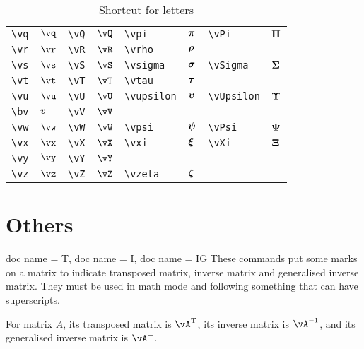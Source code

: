 \documentclass{article}
\begin{document}
\begin{table}[h]
\begin{tabular}{ll|ll|ll|ll}
    \verb"\vq" & $\vq$ & \verb"\vQ" & $\vQ$ & \verb"\vpi" & $\bm{\pi}$ & \verb"\vPi" & $\bm{\Pi}$ \\
    \verb"\vr" & $\vr$ & \verb"\vR" & $\vR$ & \verb"\vrho" & $\bm{\rho}$ & \\
    \verb"\vs" & $\vs$ & \verb"\vS" & $\vS$ & \verb"\vsigma" & $\bm{\sigma}$ & \verb"\vSigma" & $\bm{\Sigma}$ \\
    \verb"\vt" & $\vt$ & \verb"\vT" & $\vT$ & \verb"\vtau" & $\bm{\tau}$ & \\
    \verb"\vu" & $\vu$ & \verb"\vU" & $\vU$ & \verb"\vupsilon" & $\bm{\upsilon}$ & \verb"\vUpsilon" & $\bm{\Upsilon}$ \\
    \verb"\bv" & $\bm{v}$ & \verb"\vV" & $\vV$ & & \\
    \verb"\vw" & $\vw$ & \verb"\vW" & $\vW$ & \verb"\vpsi" & $\bm{\psi}$ & \verb"\vPsi" & $\bm{\Psi}$ \\
    \verb"\vx" & $\vx$ & \verb"\vX" & $\vX$ & \verb"\vxi" & $\bm{\xi}$ & \verb"\vXi" & $\bm{\Xi}$ \\
    \verb"\vy" & $\vy$ & \verb"\vY" & $\vY$ & & \\
    \verb"\vz" & $\vz$ & \verb"\vZ" & $\vZ$ & \verb"\vzeta" & $\bm{\zeta}$ & \\
    \bottomrule
    \end{tabular}
    \caption{Shortcut for letters}
    \label{tab:schortcut-letters}
\end{table}

\section{Others}

\begin{docCommands}{
    {doc name = T},
    {doc name = I},
    {doc name = IG}
}
These commands put some marks on a matrix to indicate transposed matrix, inverse matrix and generalised inverse matrix. They must be used in math mode and following something that can have superscripts.
\begin{dispExample}
For matrix $A$, its transposed matrix is $\vA\T$, its inverse matrix is $\vA\I$, 
and its generalised inverse matrix is $\vA\IG$.
\end{dispExample}
\end{docCommands}
\end{document}

